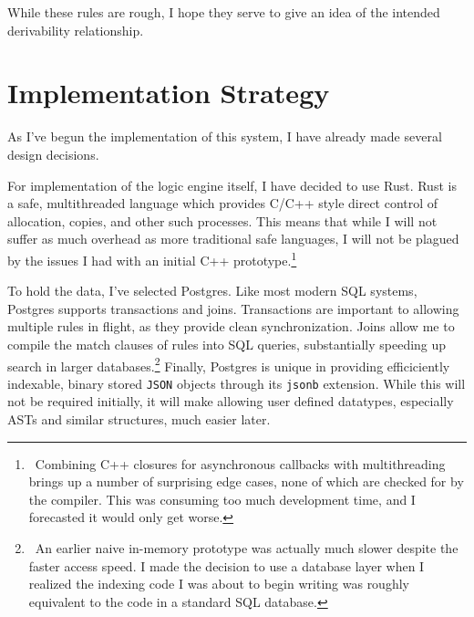 While these rules are rough, I hope they serve to give an idea of the intended derivability relationship.
\section{Implementation Strategy}
\label{sec:impl}
As I've begun the implementation of this system, I have already made several design decisions.

For implementation of the logic engine itself, I have decided to use Rust\cite{rust}.
Rust is a safe, multithreaded language which provides C/C++ style direct control of allocation, copies, and other such processes.
This means that while I will not suffer as much overhead as more traditional safe languages, I will not be plagued by the issues I had with an initial C++ prototype.\footnote{\
        Combining C++ closures for asynchronous callbacks with multithreading brings up a number of surprising edge cases, none of which are checked for by the compiler.
        This was consuming too much development time, and I forecasted it would only get worse.
}

To hold the data, I've selected Postgres.
Like most modern SQL systems, Postgres supports transactions and joins.
Transactions are important to allowing multiple rules in flight, as they provide clean synchronization.
Joins allow me to compile the match clauses of rules into SQL queries, substantially speeding up search in larger databases.\footnote{\
        An earlier naive in-memory prototype was actually much slower despite the faster access speed.
I made the decision to use a database layer when I realized the indexing code I was about to begin writing was roughly equivalent to the code in a standard SQL database.
}
Finally, Postgres is unique in providing efficiciently indexable, binary stored \texttt{JSON} objects through its \texttt{jsonb} extension.
While this will not be required initially, it will make allowing user defined datatypes, especially ASTs and similar structures, much easier later.

